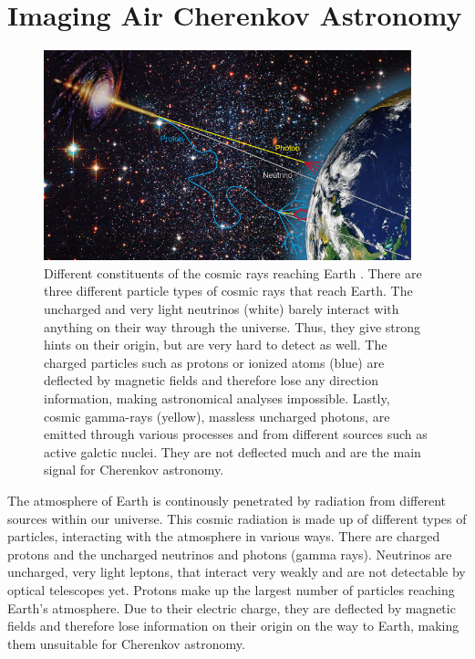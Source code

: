\chapter{Imaging Air Cherenkov Astronomy}
\label{ch:iact}
%
\begin{figure}[H]
  \centering
  \includegraphics[width=0.95\textwidth]{Plots/cosmic_rays.jpg}
  \caption{Different constituents of the cosmic rays reaching Earth \cite{cosmic-rays}. There are three different particle types of cosmic rays that reach Earth. The uncharged and very light neutrinos (white) barely interact with anything on their way through the universe. Thus, they give strong hints on their origin, but are very hard to detect as well. The charged particles such as protons or ionized atoms (blue) are deflected by magnetic fields and therefore lose any direction information, making astronomical analyses impossible. Lastly, cosmic gamma-rays (yellow), massless uncharged photons, are emitted through various processes and from different sources such as active galctic nuclei. They are not deflected much and are the main signal for Cherenkov astronomy.}
  \label{fig:rays}
\end{figure}
%
The atmosphere of Earth is continously penetrated by radiation from different
sources within our universe. This cosmic radiation is made up of different types
of particles, interacting with the atmosphere in various ways. There are
charged protons and the uncharged neutrinos and photons (gamma rays). Neutrinos
are uncharged, very light leptons, that interact very weakly and are not
detectable by optical telescopes yet. Protons make up the largest number of
particles reaching Earth's atmosphere. Due to their electric charge, they are
deflected by magnetic fields and therefore lose information on their origin on
the way to Earth, making them unsuitable for Cherenkov astronomy.
%
